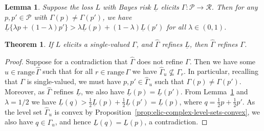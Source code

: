 \documentclass[11pt]{article}
\newtheorem{theorem}{Theorem}
\newtheorem{lemma}{Lemma}
\renewcommand{\P}{\mathcal{P}}
\newcommand{\R}{\mathcal{R}}
\newcommand{\lbar}{\underline{L}}
\newcommand{\range}{\mathrm{range}\,}
\begin{document}
\begin{lemma}
  \label{lem:elic-complex-bayes-concave}
  \label{LEM:ELIC-COMPLEX-BAYES-CONCAVE} %
  Suppose the loss $L$ with Bayes risk $\lbar$ elicits $\Gamma:\P\to\R$.
  Then for any $p,p'\in\P$ with $\Gamma(p)\neq\Gamma(p')$, we have $\lbar\{\lambda p + (1-\lambda) p'\} > \lambda \lbar(p) + (1-\lambda) \lbar(p')$ for all $\lambda\in(0,1)$.
\end{lemma}

\begin{theorem}
  \label{thm:bayes-risk-lower-bound}
  If $L$ elicits a single-valued $\Gamma$, and $\hat\Gamma$ refines $\lbar$, then $\hat\Gamma$ refines $\Gamma$.
\end{theorem}
\begin{proof}
  Suppose for a contradiction that $\hat\Gamma$ does not refine $\Gamma$.
  Then we have some $u\in\range\hat\Gamma$ such that for all $r\in\range\Gamma$ we have $\hat\Gamma_u \not\subseteq \Gamma_r$.
  In particular, recalling that $\Gamma$ is single-valued, we must have $p,p'\in\hat\Gamma_u$ such that $\Gamma(p) \neq \Gamma(p')$.
  Moreover, as $\hat\Gamma$ refines $\lbar$, we also have $\lbar(p) = \lbar(p')$.
  From Lemma~\ref{lem:elic-complex-bayes-concave} and $\lambda=1/2$ we have $\lbar(q) > \tfrac 1 2 \lbar(p) + \tfrac 1 2 \lbar(p') = \lbar(p)$, where $q = \tfrac 1 2 p + \tfrac 1 2 p'$.
  As the level set $\hat\Gamma_u$ is convex by Proposition~\ref{prop:elic-complex-level-sets-convex}, we also have $q \in \hat\Gamma_u$, and hence $\lbar(q)=\lbar(p)$, a contradiction.
\end{proof}
\end{document}
